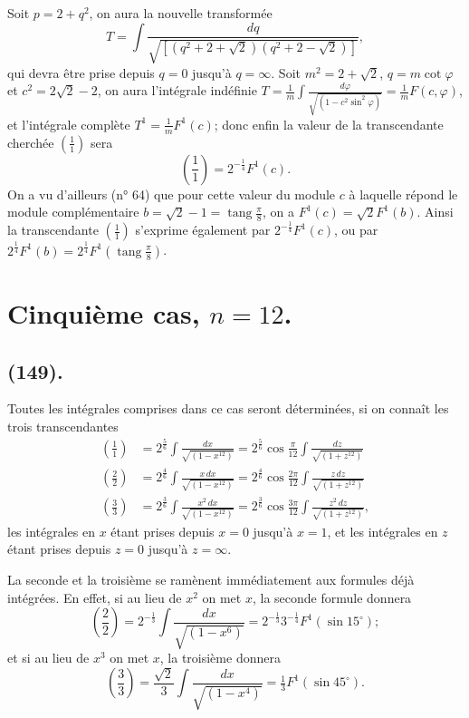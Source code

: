 \documentclass{article}
\begin{document}
Soit $p=2+q^{2}$, on aura la nouvelle transformée
\[ T=\int\frac{dq}{\sqrt{[(q^{2}+2+\sqrt{2})(q^{2}+2-\sqrt{2})]}}, \]
qui devra être prise depuis $q=0$ jusqu'à $q=\infty$. Soit $m^{2}=2+\sqrt{2}$, $q=m\cot\varphi$ et $c^{2}=2\sqrt{2}-2$, on aura l'intégrale indéfinie $T=\displaystyle\frac{1}{m}\int\frac{d\varphi}{\sqrt{(1-c^{2}\sin^{2}\varphi)}}=\frac{1}{m}F(c,\varphi)$, et l'intégrale complète $T^{1}=\frac{1}{m}F^{1}(c)$; donc enfin la valeur de la transcendante cherchée $\left(\frac{1}{1}\right)$ sera
\[ \left(\frac{1}{1}\right)=2^{-\frac{1}{4}}F^{1}(c). \]
On a vu d'ailleurs (n° 64) que pour cette valeur du module $c$ à laquelle répond le module complémentaire $b=\sqrt{2}-1=\operatorname{tang}\frac{\pi}{8}$, on a $F^{1}(c)=\sqrt{2}F^{1}(b)$. Ainsi la transcendante $\left(\frac{1}{1}\right)$ s'exprime également par $2^{-\frac{1}{4}}F^{1}(c)$, ou par $2^{\frac{1}{4}}F^{1}(b)=2^{\frac{1}{4}}F^{1}\left(\operatorname{tang}\frac{\pi}{8}\right)$.


\section*{Cinquième cas, $n=12$.}

\subsection*{(149).}

Toutes les intégrales comprises dans ce cas seront déterminées, si on connaît les trois transcendantes
\[ \begin{aligned} \left(\frac{1}{1}\right)&=2^{\frac{5}{6}}\int\frac{dx}{\sqrt{(1-x^{12})}}=2^{\frac{5}{6}}\cos\frac{\pi}{12}\int\frac{dz}{\sqrt{(1+z^{12})}}\\ \left(\frac{2}{2}\right)&=2^{\frac{4}{6}}\int\frac{x\,dx}{\sqrt{(1-x^{12})}}=2^{\frac{4}{6}}\cos\frac{2\pi}{12}\int\frac{z\,dz}{\sqrt{(1+z^{12})}}\\ \left(\frac{3}{3}\right)&=2^{\frac{3}{6}}\int\frac{x^{2}\,dx}{\sqrt{(1-x^{12})}}=2^{\frac{3}{6}}\cos\frac{3\pi}{12}\int\frac{z^{2}\,dz}{\sqrt{(1+z^{12})}}, \end{aligned} \]
les intégrales en $x$ étant prises depuis $x=0$ jusqu'à $x=1$, et les intégrales en $z$ étant prises depuis $z=0$ jusqu'à $z=\infty$.

La seconde et la troisième se ramènent immédiatement aux formules déjà intégrées. En effet, si au lieu de $x^{2}$ on met $x$, la seconde formule donnera
\[ \left(\frac{2}{2}\right)=2^{-\frac{1}{3}}\int\frac{dx}{\sqrt{(1-x^{6})}}=2^{-\frac{1}{3}}3^{-\frac{1}{4}}F^{1}(\sin 15^{\circ}); \]
et si au lieu de $x^{3}$ on met $x$, la troisième donnera
\[ \left(\frac{3}{3}\right)=\frac{\sqrt{2}}{3}\int\frac{dx}{\sqrt{(1-x^{4})}}=\tfrac{1}{3}F^{1}(\sin 45^{\circ}). \]
\end{document}
